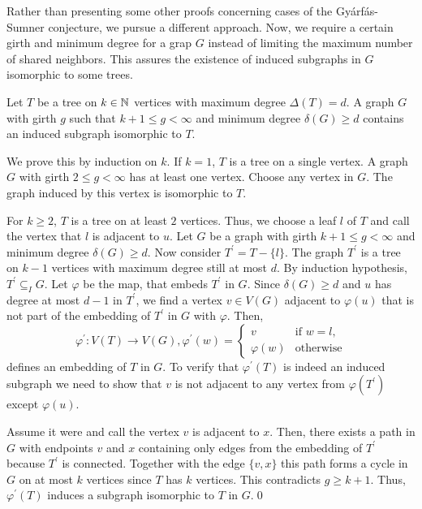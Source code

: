 Rather than presenting some other proofs concerning cases of the Gyárfás-Sumner conjecture, we pursue a different approach. Now, we require a certain girth and minimum degree for a grap $G$ instead of limiting the maximum number of shared neighbors. This assures the existence of induced subgraphs in $G$ isomorphic to some trees.
\newpage

\begin{thm}
Let $T$ be a tree on $k\in\mathbb{N}$ vertices with maximum degree $\Delta (T)=d$. A graph $G$ with girth $g$ such that $k+1\leq g<\infty$ and minimum degree $\delta (G)\geq d$ contains an induced subgraph isomorphic to $T$.
\end{thm}
\begin{prf}
We prove this by induction on $k$. If $k=1$, $T$ is a tree on a single vertex. A graph $G$ with girth $2\leq g<\infty$ has at least one vertex. Choose any vertex in $G$. The graph induced by this vertex is isomorphic to $T$.

For $k\geq 2$, $T$ is a tree on at least $2$ vertices. Thus, we choose a leaf $l$ of $T$ and call the vertex that $l$ is adjacent to $u$. Let $G$ be a graph with girth $k+1\leq g<\infty$ and minimum degree $\delta (G)\geq d$. Now consider $T^\prime = T-\{l\}$. The graph $T^\prime$ is a tree on $k-1$ vertices with maximum degree still at most $d$. By induction hypothesis, $T^\prime\subseteq_I G$. Let $\varphi$ be the map, that embeds $T^\prime$ in $G$. Since $\delta (G)\geq d$ and $u$ has degree at most $d-1$ in $T^\prime$, we find a vertex $v\in V(G)$ adjacent to $\varphi (u)$ that is not part of the embedding of $T^\prime$ in $G$ with $\varphi$. Then,
\[\varphi^\prime :V(T)\to V(G), \varphi^\prime (w)=\begin{cases}v&\text{if }w=l,\\ \varphi (w) &\text{otherwise}\end{cases}\]
defines an embedding of $T$ in $G$. To verify that $\varphi^\prime (T)$ is indeed an induced subgraph we need to show that $v$ is not adjacent to any vertex from $\varphi (T^\prime )$ except $\varphi (u)$.

Assume it were and call the vertex $v$ is adjacent to $x$. Then, there exists a path in $G$ with endpoints $v$ and $x$ containing only edges from the embedding of $T^\prime$ because $T^\prime$ is connected. Together with the edge $\{v,x\}$ this path forms a cycle in $G$ on at most $k$ vertices since $T$ has $k$ vertices. This contradicts $g\geq k+1$. Thus, $\varphi^\prime (T)$ induces a subgraph isomorphic to $T$ in $G$.\qed
\end{prf}

